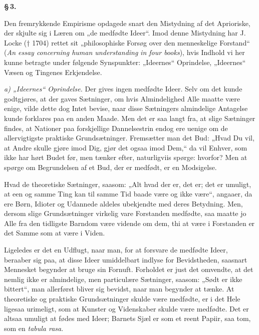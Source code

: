 \documentclass[12pt]{book}
\newcommand{\opage}[1]{\marginnote{\footnotesize\textit{[#1]}}}
\begin{document}
\begin{center}{\bfseries \S\,3.}\end{center}

Den fremrykkende Empirisme opdagede snart den Mistydning af det Aprioriske, der
skjulte sig i Læren om „de medfødte Ideer“. Imod denne Mistydning har J. Locke
(† 1704) rettet sit „philosophiske Forsøg over den menneskelige Forstand“
(\textit{An essay concerning human understanding}
\opage{11} \textit{in four books}), hvis Indhold vi her kunne betragte under følgende
Synspunkter: „Ideernes“ Oprindelse, „Ideernes“ Væsen og Tingenes Erkjendelse.

\emph{a) „Ideernes“ Oprindelse.} Der gives ingen medfødte Ideer. Selv om det kunde
godtgjøres, at der gaves Sætninger, om hvis Almindelighed Alle maatte være enige,
vilde dette dog Intet bevise, naar disse Sætningers almindelige Antagelse kunde
forklares paa en anden Maade. Men det er saa langt fra, at slige Sætninger findes,
at Nationer paa forskjellige Dannelsestrin endog ere uenige om de allervigtigste
praktiske Grundsætninger. Fremsætter man det Bud: „Hvad Du vil, at Andre skulle
gjøre imod Dig, gjør det ogsaa imod Dem,“ da vil Enhver, som ikke har hørt Budet
før, men tænker efter, naturligviis spørge: hvorfor? Men at spørge om Begrundelsen
af et Bud, der er medfødt, er en Modsigelse.

Hvad de theoretiske Sætninger, saasom: „Alt hvad der er, det er; det er umuligt, at
een og samme Ting kan til samme Tid baade være og ikke være“, angaaer, da ere Børn,
Idioter og Udannede aldeles ubekjendte med deres Betydning. Men, dersom slige
Grundsætninger virkelig vare Forstanden medfødte, saa maatte jo Alle fra den
tidligste Barndom være vidende om dem, thi at være i Forstanden er det Samme som at
være i Viden.

Ligeledes er det en Udflugt, naar man, for at forsvare de medfødte Ideer, beraaber
sig paa, at disse Ideer umiddelbart indlyse for Bevidstheden, saasnart Mennesket
begynder at bruge sin Fornuft. Forholdet er just det omvendte, at det nemlig ikke
er almindelige, men particulære Sætninger, saasom: „Sødt er ikke bittert“, man
allerførst bliver sig bevidst, naar man begynder at tænke. At theoretiske og
praktiske Grundsætninger skulde være medfødte, er i det Hele ligesaa urimeligt, som
at Kunster og Videnskaber skulde være medfødte. Det er altsaa umuligt at fødes med
Ideer;
\opage{12} Barnets Sjæl er som et reent Papiir, saa tom, som en \textit{tabula rasa}.
\end{document}
